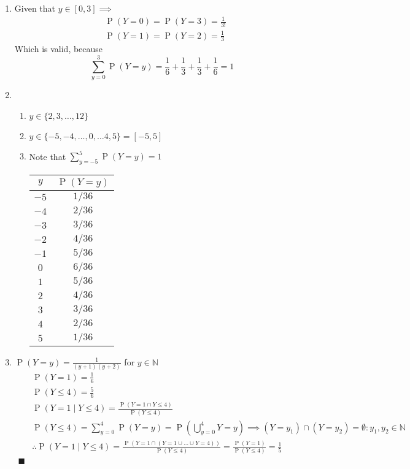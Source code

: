 \documentclass{article}
\title{\MakeUppercase{\jobname}}
\author{Justin Nguyen}
\date{\today}
\newcommand{\ns}[1]{\mathbb{#1}}
\newcommand{\set}[1]{\{#1\}}
\newcommand{\pr}[1]{\operatorname{P}(#1)}
\begin{document}
\maketitle

\begin{enumerate}
  \item Given that $y \in [0,3] \implies $
  \begin{align*}
    & \pr{Y = 0} = \pr{Y = 3} = \frac{1}{3!}\\
    & \pr{Y = 1} = \pr{Y = 2} = \frac{1}{3}
  \end{align*}
  Which is valid, because
  \[ \sum_{y=0}^{3}\pr{Y=y} = \frac{1}{6} + \frac{1}{3} + \frac{1}{3} + \frac{1}{6} =  1 \]
  \item \begin{enumerate}
    \item $y \in \set{2, 3, \ldots, 12}$
    \item $y \in \set{-5, -4, \ldots, 0, \ldots 4, 5} = [-5,5]$
    \item Note that $\sum_{y=-5}^{5}\pr{Y=y} = 1$
    \begin{flushleft}
      \begin{tabular}{|c|c|}
        \hline 
        $y$ & $\pr{Y = y}$\\
        \hline 
        $-5$ & $1/36$\\
        \hline
        $-4$ & $2/36$\\
        \hline
        $-3$ & $3/36$\\
        \hline
        $-2$ & $4/36$\\
        \hline
        $-1$ & $5/36$\\
        \hline
        $0$ & $6/36$\\
        \hline
        $1$ & $5/36$\\
        \hline
        $2$ & $4/36$\\
        \hline
        $3$ & $3/36$\\
        \hline
        $4$ & $2/36$\\
        \hline
        $5$ & $1/36$\\
        \hline
      \end{tabular}
    \end{flushleft}
  \end{enumerate}
  \item $\pr{Y=y} = \frac{1}{(y+1)(y+2)}$ for $y \in \ns{N}$\\
  \begin{align*}
    & \pr{Y = 1} = \frac{1}{6}\\
    & \pr{Y \leq 4} = \frac{5}{6}\\
    & \pr{Y=1 \mid Y\leq 4} = \frac{\pr{Y = 1 \cap Y \leq 4}}{\pr{Y \leq 4}}\\
    & \pr{Y \leq 4} = \sum_{y=0}^{4}\pr{Y=y} = \pr{\bigcup_{y=0}^{4}Y=y} \implies (Y=y_1) \cap (Y=y_2) = \emptyset: y_1,y_2 \in\ns{N}\\
    & \therefore \pr{Y=1 \mid Y\leq 4} = \frac{\pr{Y = 1 \cap (Y = 1 \cup \ldots \cup Y = 4)}}{\pr{Y \leq 4}} = \frac{\pr{Y = 1}}{\pr{Y \leq 4}} = \frac{1}{5}
    \\\blacksquare
  \end{align*}
  

\end{enumerate}
\end{document}
